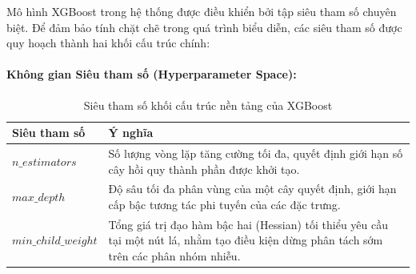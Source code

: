 Mô hình XGBoost trong hệ thống được điều khiển bởi tập siêu tham số chuyên biệt. Để đảm bảo tính chặt chẽ trong quá trình biểu diễn, các siêu tham số được quy hoạch thành hai khối cấu trúc chính:

\paragraph{Không gian Siêu tham số (Hyperparameter Space):}

\begin{table}[htbp]
\centering
\caption{Siêu tham số khối cấu trúc nền tảng của XGBoost}
\label{tab:xgb_structure}
\renewcommand{\arraystretch}{1.3}
\begin{tabular}{p{4.2cm} p{10.2cm}}
\toprule
\textbf{Siêu tham số} & \textbf{Ý nghĩa} \\
\midrule
$n\_estimators$ & Số lượng vòng lặp tăng cường tối đa, quyết định giới hạn số cây hồi quy thành phần được khởi tạo. \\
$max\_depth$ & Độ sâu tối đa phân vùng của một cây quyết định, giới hạn cấp bậc tương tác phi tuyến của các đặc trưng. \\
$min\_child\_weight$ & Tổng giá trị đạo hàm bậc hai (Hessian) tối thiểu yêu cầu tại một nút lá, nhằm tạo điều kiện dừng phân tách sớm trên các phân nhóm nhiễu. \\
\bottomrule
\end{tabular}
\end{table}

